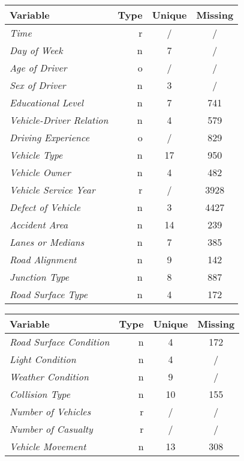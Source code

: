 \documentclass{article}
\begin{document}
\begin{table}[H]
    \parbox{.5\linewidth}{
        \begin{tabular}{l|r|c|c}
            \textbf{Variable} & \textbf{Type} & \textbf{Unique} & \textbf{Missing}\\\hline
            \textit{Time} & r & / & / \\
            \textit{Day of Week} & n & 7 & /\\
            \textit{Age of Driver} & o & / & /\\
            \textit{Sex of Driver} & n & 3 &/ \\
            \textit{Educational Level} & n & 7 & 741\\
            \textit{Vehicle-Driver Relation} & n & 4 & 579 \\
            \textit{Driving Experience} & o & / & 829\\
            \textit{Vehicle Type} & n & 17 & 950\\
            \textit{Vehicle Owner} & n & 4 & 482\\
            \textit{Vehicle Service Year} & r & / & 3928\\
            \textit{Defect of Vehicle} & n & 3 & 4427\\
            \textit{Accident Area} & n & 14 & 239\\
            \textit{Lanes or Medians} & n & 7 & 385\\
            \textit{Road Alignment} & n & 9 & 142\\
            \textit{Junction Type} & n & 8 & 887\\
            \textit{Road Surface Type} & n  & 4 & 172
        \end{tabular}
}
    \hfill
    \parbox{.5\linewidth}{
        \begin{tabular}{l|r|c|c}
            \textbf{Variable} & \textbf{Type} & \textbf{Unique} & \textbf{Missing}\\\hline
            \textit{Road Surface Condition} & n & 4 & 172\\
            \textit{Light Condition} & n & 4 & /\\
            \textit{Weather Condition} & n & 9 &/\\
            \textit{Collision Type} & n & 10  & 155\\
            \textit{Number of Vehicles} & r & / &/\\
            \textit{Number of Casualty} & r & / &/\\
            \textit{Vehicle Movement} & n & 13 & 308\\

\end{tabular}}
\end{table}
\end{document}
